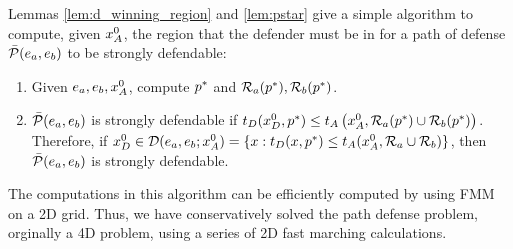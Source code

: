 Lemmas \ref{lem:d_winning_region} and \ref{lem:pstar} give a simple algorithm to compute, given $x_A^0$, the region that the defender must be in for a path of defense $\bar{\mathcal{P}}(e_a,e_b)$ to be strongly defendable:
\begin{enumerate}
\item Given $e_a, e_b,x_A^0$, compute $p^*$ and $\mathcal{R}_a(p^*),\mathcal{R}_b(p^*)$.
\item $\bar{\mathcal{P}}(e_a,e_b)$ is strongly defendable if $t_D(x_D^0, p^*)\le t_A\left(x_A^0,\mathcal{R}_a(p^*)\cup\mathcal{R}_b(p^*)\right)$. Therefore, if $x_D^0\in\mathcal{D}(e_a,e_b;x_A^0)=\{x:t_D(x,p^*) \le t_A(x_A^0,\mathcal{R}_a \cup \mathcal{R}_b)\}$, then $\bar{\mathcal{P}}(e_a,e_b)$ is strongly defendable.
\end{enumerate}

The computations in this algorithm can be efficiently computed by using FMM \cite{Sethian1996} on a 2D grid. Thus, we have conservatively solved the path defense problem, orginally a 4D problem, using a series of 2D fast marching calculations. 

